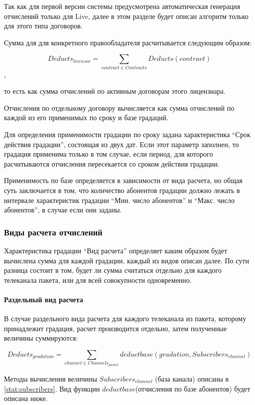 Так как для первой версии системы предусмотрена автоматическая генерация отчислений 
только для Live, далее в этом разделе будет описан алгоритм только для этого типа договоров.

Сумма для для конкретного правообладателя расчитывается следующим образом:

$$Deducts_{licensor} = \sum_{contract \in Contracts} Deducts(contract)$$,

то есть как сумма отчислений по активным договорам этого лицензиара. 

Отчисления по отдельному договору вычисляется как сумма отчислений по каждой из его применимых по сроку и базе градаций.

Для определения применимости градации по сроку задана характеристика ``Срок действия градации'', состоящая из двух дат.
Если этот параметр заполнен, то градация применима только в том случае, если период, 
для которого расчитываются отчисления пересекается со сроком действия градации. 

Применимость по базе определяется в зависимости от вида расчета, но общая суть заключается в том, 
что количество абонентов градации должно лежать в интервале характеристик градации ``Мин. число абонентов'' и
``Макс. число абонентов'', в случае если они заданы.  

\subsubsection{Виды расчета отчислений}
Характеристика градации ``Вид расчета'' определяет каким образом будет вычислена сумма для каждой градации,
каждый из видов описан далее. По сути разница состоит в том, будет ли сумма считаться отдельно
для каждого телеканала пакета, или для всей совокупности одновременно.

\paragraph{Раздельный вид расчета}
В случае раздельного вида расчета для каждого телеканала из пакета, которому принадлежит градация,
расчет производится отдельно, затем полученные величины суммируются:

$$Deducts_{gradation} = \sum_{channel \in Channels_{packet}} deductbase(gradation, Subscribers_{channel})$$

Методы вычисления величины $Subscribers_{channel}$ (база канала) описаны в \ref{stat:subscribers}.
Вид функции $deductbase$(отчисления по базе абонентов) будет описана ниже. 

